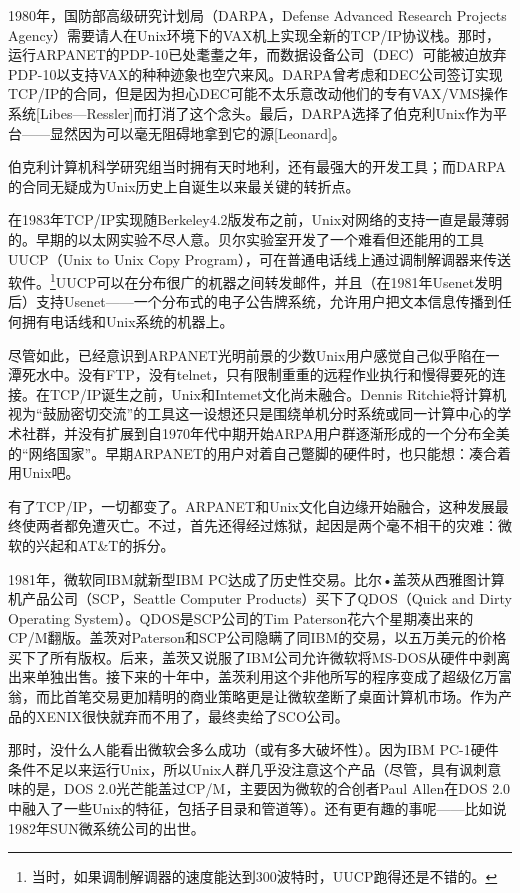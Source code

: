 \documentclass[12pt,oneside]{book}
\begin{document}
\begin{common-format}
1980年，国防部高级研究计划局（DARPA，Defense Advanced Research Projects Agency）需要请人在Unix环境下的VAX机上实现全新的TCP/IP协议栈。那时，运行ARPANET的PDP-10已处耄耋之年，而数据设备公司（DEC）可能被迫放弃PDP-10以支持VAX的种种迹象也空穴来风。DARPA曾考虑和DEC公司签订实现TCP/IP的合同，但是因为担心DEC可能不太乐意改动他们的专有VAX/VMS操作系统[Libes—Ressler]而打消了这个念头。最后，DARPA选择了伯克利Unix作为平台——显然因为可以毫无阻碍地拿到它的源[Leonard]。

伯克利计算机科学研究组当时拥有天时地利，还有最强大的开发工具；而DARPA的合同无疑成为Unix历史上自诞生以来最关键的转折点。

在1983年TCP/IP实现随Berkeley4.2版发布之前，Unix对网络的支持一直是最薄弱的。早期的以太网实验不尽人意。贝尔实验室开发了一个难看但还能用的工具UUCP（Unix to Unix Copy Program），可在普通电话线上通过调制解调器来传送软件。\footnote{当时，如果调制解调器的速度能达到300波特时，UUCP跑得还是不错的。}UUCP可以在分布很广的杌器之间转发邮件，并且（在1981年Usenet发明后）支持Usenet——一个分布式的电子公告牌系统，允许用户把文本信息传播到任何拥有电话线和Unix系统的机器上。

尽管如此，已经意识到ARPANET光明前景的少数Unix用户感觉自己似乎陷在一潭死水中。没有FTP，没有telnet，只有限制重重的远程作业执行和慢得要死的连接。在TCP/IP诞生之前，Unix和Intemet文化尚未融合。Dennis Ritchie将计算机视为“鼓励密切交流”的工具这一设想还只是围绕单机分时系统或同一计算中心的学术社群，并没有扩展到自1970年代中期开始ARPA用户群逐渐形成的一个分布全美的“网络国家”。早期ARPANET的用户对着自己蹩脚的硬件时，也只能想：凑合着用Unix吧。

有了TCP/IP，一切都变了。ARPANET和Unix文化自边缘开始融合，这种发展最终使两者都免遭灭亡。不过，首先还得经过炼狱，起因是两个毫不相干的灾难：微软的兴起和AT\&{}T的拆分。

1981年，微软同IBM就新型IBM PC达成了历史性交易。比尔•盖茨从西雅图计算机产品公司（SCP，Seattle Computer Products）买下了QDOS（Quick and Dirty Operating System）。QDOS是SCP公司的Tim Paterson花六个星期凑出来的CP/M翻版。盖茨对Paterson和SCP公司隐瞒了同IBM的交易，以五万美元的价格买下了所有版权。后来，盖茨又说服了IBM公司允许微软将MS-DOS从硬件中剥离出来单独出售。接下来的十年中，盖茨利用这个非他所写的程序变成了超级亿万富翁，而比首笔交易更加精明的商业策略更是让微软垄断了桌面计算机市场。作为产品的XENIX很快就弃而不用了，最终卖给了SCO公司。

那时，没什么人能看出微软会多么成功（或有多大破坏性）。因为IBM PC-1硬件条件不足以来运行Unix，所以Unix人群几乎没注意这个产品（尽管，具有讽刺意味的是，DOS 2.0光芒能盖过CP/M，主要因为微软的合创者Paul Allen在DOS 2.0中融入了一些Unix的特征，包括子目录和管道等）。还有更有趣的事呢——比如说1982年SUN微系统公司的出世。


\end{common-format}
\end{document}
